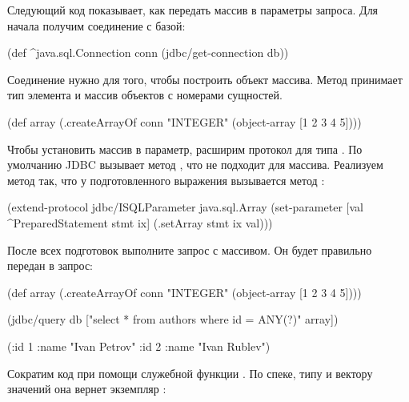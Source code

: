Следующий код показывает, как передать массив в параметры запроса. Для начала получим соединение с базой:

\begin{english}
  \begin{clojure}
(def ^java.sql.Connection conn
  (jdbc/get-connection db))
  \end{clojure}
\end{english}

Соединение нужно для того, чтобы построить объект массива. Метод  принимает тип элемента и массив объектов  с номерами сущностей.

\begin{english}
  \begin{clojure}
(def array
  (.createArrayOf conn "INTEGER"
                  (object-array [1 2 3 4 5])))
  \end{clojure}
\end{english}

Чтобы установить массив в параметр, расширим протокол  для типа . По умолчанию JDBC вызывает метод , что не подходит для массива. Реализуем метод  так, что у подготовленного выражения вызывается метод :

\begin{english}
  \begin{clojure}
(extend-protocol jdbc/ISQLParameter
  java.sql.Array
  (set-parameter [val ^PreparedStatement stmt ix]
    (.setArray stmt ix val)))
  \end{clojure}
\end{english}

После всех подготовок выполните запрос с массивом. Он будет правильно передан в запрос:

\begin{english}
  \begin{clojure}
(def array
  (.createArrayOf conn "INTEGER"
                  (object-array [1 2 3 4 5])))

(jdbc/query db ["select * from authors
                 where id = ANY(?)" array])

({:id 1 :name "Ivan Petrov"}
 {:id 2 :name "Ivan Rublev"})
  \end{clojure}
\end{english}

Сократим код при помощи служебной функции . По спеке, типу и вектору значений она вернет экземпляр :

